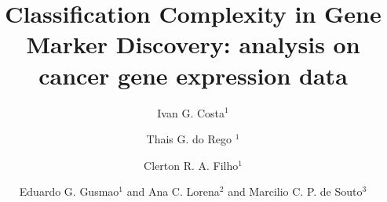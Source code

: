 \documentclass[10pt]{bmc_article}
\newenvironment{bmcformat}{\begin{raggedright}\baselineskip20pt\sloppy\setboolean{publ}{false}}{\end{raggedright}\baselineskip20pt\sloppy}
\begin{document}
\begin{bmcformat}



\title{Classification Complexity in Gene Marker Discovery: analysis on cancer gene expression data}



\author{Ivan G. Costa\correspondingauthor$^1$%
      \and
         Thais G. do Rego $^1$%
      \and
         Clerton R. A. Filho$^1$%
      \and
         Eduardo G. Gusmao$^1$%
       and
         Ana C. Lorena$^{2}$ 
       and
         Marcilio C. P. de Souto$^{3}$ 
      }



\address{
    \iid(1) Center of Informatics, Federal University of Pernambuco, Brazil\\
    \iid(2) Center of Mathematics, Computation and Cognition, ABC Fed. Univ., SP, Brazil\\
    \iid(3) Dept. of Informatics and Applied Mathematics, Fed. Univ. of Rio Grande do Norte, Brazil
}

\maketitle


\end{bmcformat}
\end{document}
